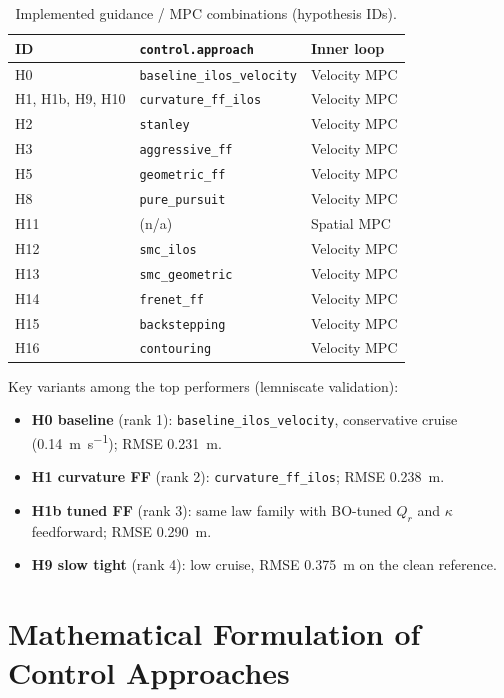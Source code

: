 \documentclass[11pt,a4paper]{article}
\begin{document}
\begin{table}[H]
  \centering
  \caption{Implemented guidance / MPC combinations (hypothesis IDs).}
  \label{tab:approaches}
  \small
  \begin{tabular}{@{}lll@{}}
    \toprule
    ID & \texttt{control.approach} & Inner loop \\
    \midrule
    H0 & \texttt{baseline\_ilos\_velocity} & Velocity MPC \\
    H1, H1b, H9, H10 & \texttt{curvature\_ff\_ilos} & Velocity MPC \\
    H2 & \texttt{stanley} & Velocity MPC \\
    H3 & \texttt{aggressive\_ff} & Velocity MPC \\
    H5 & \texttt{geometric\_ff} & Velocity MPC \\
    H8 & \texttt{pure\_pursuit} & Velocity MPC \\
    H11 & (n/a) & Spatial MPC \\
    H12 & \texttt{smc\_ilos} & Velocity MPC \\
    H13 & \texttt{smc\_geometric} & Velocity MPC \\
    H14 & \texttt{frenet\_ff} & Velocity MPC \\
    H15 & \texttt{backstepping} & Velocity MPC \\
    H16 & \texttt{contouring} & Velocity MPC \\
    \bottomrule
  \end{tabular}
\end{table}

Key variants among the top performers (lemniscate validation):
\begin{itemize}[noitemsep]
  \item \textbf{H0 baseline} (rank 1): \texttt{baseline\_ilos\_velocity}, conservative
        cruise (\SI{0.14}{\meter\per\second}); RMSE \SI{0.231}{\meter}.
  \item \textbf{H1 curvature FF} (rank 2): \texttt{curvature\_ff\_ilos}; RMSE
        \SI{0.238}{\meter}.
  \item \textbf{H1b tuned FF} (rank 3): same law family with BO-tuned $Q_r$ and
        $\kappa$ feedforward; RMSE \SI{0.290}{\meter}.
  \item \textbf{H9 slow tight} (rank 4): low cruise, RMSE \SI{0.375}{\meter} on the clean
        reference.
\end{itemize}

\section{Mathematical Formulation of Control Approaches}
\label{sec:theory}
\end{document}
